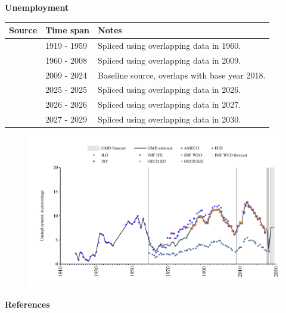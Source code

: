 \documentclass[12pt,a4paper,landscape]{article}
\begin{document}
\begin{adjustbox}{max totalsize={\paperwidth}{\paperheight},center}
\begin{minipage}[t][\textheight][t]{\textwidth}
\vspace*{0.5cm}
{}
\begin{center}
{\Large\bfseries Unemployment}
\end{center}
\vspace{0.5cm}
\begin{table}[H]
\centering
\small
\begin{tabular}{|l|l|l|}
\hline
\textbf{Source} & \textbf{Time span} & \textbf{Notes} \\
\hline
\rowcolor{white}\cite{JST}& 1919 - 1959 &Spliced using overlapping data in 1960. \\
\rowcolor{lightgray}\cite{OECD_EO}& 1960 - 2008 &Spliced using overlapping data in 2009. \\
\rowcolor{white}\cite{EUS}& 2009 - 2024 &Baseline source, overlaps with base year 2018. \\
\rowcolor{lightgray}\cite{OECD_EO}& 2025 - 2025 &Spliced using overlapping data in 2026. \\
\rowcolor{white}\cite{AMECO}& 2026 - 2026 &Spliced using overlapping data in 2027. \\
\rowcolor{lightgray}\cite{IMF_WEO_forecast}& 2027 - 2029 &Spliced using overlapping data in 2030. \\
\hline
\end{tabular}
\end{table}
\begin{figure}[H]
\centering
\includegraphics[width=\textwidth,height=0.6\textheight,keepaspectratio]{graphs/ITA_unemp.pdf}
\end{figure}
\end{minipage}
\end{adjustbox}
{}
\begin{center}
{\Large\bfseries References}
\end{center}
\small


\end{document}

